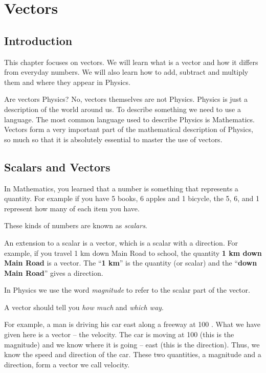 \chapter{Vectors}
\label{chap:vectors}

\section{Introduction}
This chapter focuses on vectors. We will learn what is a vector and how it differs from everyday numbers. We will also learn how to add, subtract and multiply them and where they appear in Physics.

Are vectors Physics? No, vectors themselves are not Physics. Physics is just a description of the world around us. To describe something we need to use a language. The most common language used to describe Physics is Mathematics. Vectors form a very important part of the mathematical description of Physics, so much so that it is
absolutely essential to master the use of vectors.\\
\section{Scalars and Vectors}
In Mathematics, you learned that a number is something that represents a quantity. For example if you have 5 books, 6 apples and 1 bicycle, the 5, 6, and 1 represent how many of each item you have.

These kinds of numbers are known as \textit{scalars}.


An extension to a scalar is a vector, which is a scalar with a direction. For example, if you travel 1 km down Main Road to school, the quantity \textbf{1 km down Main Road} is a vector. The ``\textbf{1 km}'' is the quantity (or scalar) and the ``\textbf{down Main Road}'' gives a direction.

In Physics we use the word \textit{magnitude} to refer to the scalar part of the vector.


A vector should tell you \emph{how much} and \emph{which way}.

For example, a man is driving his car east along a freeway at 100 \kph. What we have given here is a vector -- the velocity. The car is moving at 100 \kph (this is the magnitude) and we know where it is going -- east (this is the direction). Thus, we know the speed and direction of the car. These two quantities, a magnitude and a direction, form a vector we call velocity.

